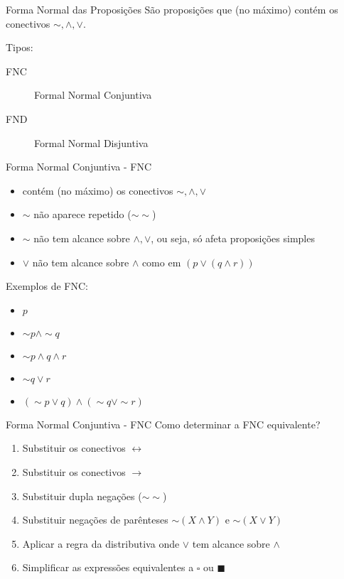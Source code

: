 \begin{frame}[t]{Forma Normal das Proposições}
	São proposições que (no máximo) contém os conectivos $\sim, \wedge, \vee$.
	
	Tipos:

	\begin{description}
	\item [FNC] Formal Normal Conjuntiva
	\item [FND] Formal Normal Disjuntiva
	\end{description}
\end{frame}

\begin{frame}[t]{Forma Normal Conjuntiva - FNC}
	\begin{itemize}
	\item contém (no máximo) os conectivos $\sim, \wedge, \vee$
	\item $\sim$ não aparece repetido ($\sim\sim$)
	\item $\sim$ não tem alcance sobre $\wedge, \vee$, ou seja, só afeta proposições simples
	\item $\vee$ não tem alcance sobre $\wedge$ como em $(p \vee (q \wedge r))$
	\end{itemize}

	Exemplos de FNC:

	\begin{itemize}
	\item $p$
	\item $\sim p \wedge\sim q$
	\item $\sim p \wedge q \wedge r$
	\item $\sim q \vee r$
	\item $(\sim p \vee q) \wedge (\sim q \vee\sim r)$
	\end{itemize}
\end{frame}

\begin{frame}[t]{Forma Normal Conjuntiva - FNC}
	Como determinar a FNC equivalente?

	\begin{enumerate}
	\item Substituir os conectivos $\leftrightarrow$
	\item Substituir os conectivos $\rightarrow$
	\item Substituir dupla negações ($\sim\sim$)
	\item Substituir negações de parênteses $\sim(X \wedge Y)$ e $\sim(X \vee Y)$
	\item Aplicar a regra da distributiva onde $\vee$ tem alcance sobre $\wedge$
	\item Simplificar as expressões equivalentes a $\square$ ou $\blacksquare$
	\end{enumerate}
\end{frame}

